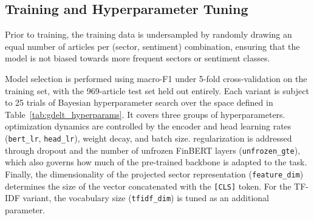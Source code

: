 \subsection{Training and Hyperparameter Tuning}
\label{sec:hyperparams}

Prior to training, the training data is undersampled by randomly drawing an equal number of articles per (sector, sentiment) combination, ensuring that the model is not biased towards more frequent sectors or sentiment classes. 

Model selection is performed using macro-F1 under 5-fold cross-validation on the training set, with the 969-article test set held out entirely. Each variant is subject to 25 trials of Bayesian hyperparameter search over the space defined in Table~\ref{tab:gdelt_hyperparams}. It covers three groups of hyperparameters. optimization dynamics are controlled by the encoder and head learning rates (\texttt{bert\_lr}, \texttt{head\_lr}), weight decay, and batch size. regularization is addressed through dropout and the number of unfrozen FinBERT layers (\texttt{unfrozen\_gte}), which also governs how much of the pre-trained backbone is adapted to the task. Finally, the dimensionality of the projected sector representation (\texttt{feature\_dim}) determines the size of the vector concatenated with the \texttt{[CLS]} token. For the TF-IDF variant, the vocabulary size (\texttt{tfidf\_dim}) is tuned as an additional parameter.

